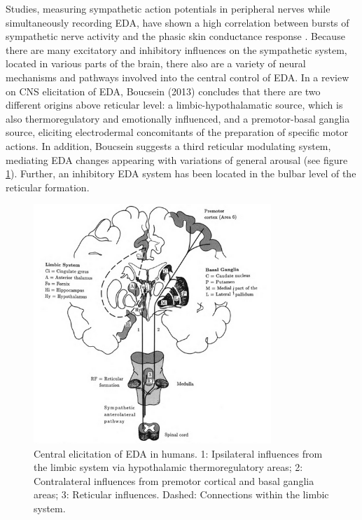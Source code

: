 Studies, measuring sympathetic action potentials in peripheral nerves while simultaneously recording EDA, have shown a high correlation between bursts of sympathetic nerve activity and the phasic skin conductance response \cite{HANDBOOKPP}. Because there are many excitatory and inhibitory influences on the sympathetic system, located in various parts of the brain, there also are a variety of neural mechanisms and pathways involved into the central control of EDA.
In a review on CNS elicitation of EDA, Boucsein (2013) concludes that there are two different origins above reticular level: a limbic-hypothalamatic source, which is also thermoregulatory and emotionally influenced, and a premotor-basal ganglia source, eliciting electrodermal concomitants of the preparation of specific motor actions. In addition, Boucsein suggests a third reticular modulating system, mediating EDA changes appearing with variations of general arousal (see figure \ref{znsImg}). Further, an inhibitory EDA system has been located in the bulbar level of the reticular formation.

\begin{figure}[ht]
\centering
\includegraphics[width=0.8\textwidth]{images/zns.png}
\caption{Central elicitation of EDA in humans. 1: Ipsilateral influences from the limbic system via hypothalamic thermoregulatory areas; 2: Contralateral influences from premotor cortical and basal ganglia areas; 3: Reticular influences. Dashed: Connections within the limbic system.\citep{boucsein2013electrodermal}}
\label{znsImg}
\end{figure}

